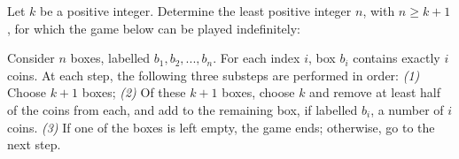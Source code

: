 Let $k$ be a positive integer.  Determine the least positive integer $n$, with $n\geq k+1$, for which the game below can be played indefinitely:

Consider $n$ boxes, labelled $b_1,b_2,...,b_n$. For each index $i$, box $b_i$ contains exactly $i$ coins. At each step, the following three substeps are performed in order:
\textit{(1)} Choose $k+1$ boxes;
\textit{(2)} Of these $k+1$ boxes, choose $k$ and remove at least half of the coins from each, and add  to the remaining box, if labelled $b_i$, a number of $i$ coins.
\textit{(3)} If one of the boxes is left empty, the game ends; otherwise, go to the next step.


